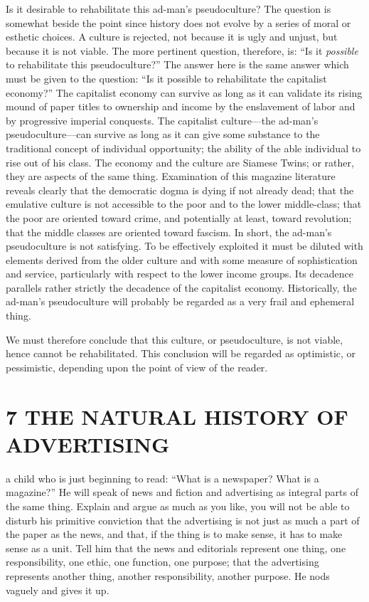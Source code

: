 \documentclass[nohyper,openany,nobib]{tufte-book}
\let\oldchapter\chapter
\def\chapter{%
  \setcounter{footnote}{0}%
  \oldchapter
}
\begin{document}
Is it desirable to rehabilitate this ad-man's pseudoculture? The
question is somewhat beside the point since history does not evolve by a
series of moral or esthetic choices. A culture is rejected, not because
it is ugly and unjust, but because it is not viable. The more pertinent
question, therefore, is: ``Is it \emph{possible} to rehabilitate this
pseudoculture?'' The answer here is the same answer which must be given
to the question: ``Is it possible to rehabilitate the capitalist
economy?'' The capitalist economy can survive as long as it can validate
its rising mound of paper titles to ownership and income by the
enslavement of labor and by progressive imperial conquests. The
capitalist culture---the ad-man's pseudoculture---can survive as long as
it can give some substance to the traditional concept of individual
opportunity; the ability of the able individual to rise out of his
class. The economy and the culture are Siamese Twins; or rather, they
are aspects of the same thing. Examination of this magazine literature
reveals clearly that the democratic dogma is dying if not already dead;
that the emulative culture is not accessible to the poor and to the
lower middle-class; that the poor are oriented toward crime, and
potentially at least, toward revolution; that the middle classes are
oriented toward fascism. In short, the ad-man's pseudoculture is not
satisfying. To be effectively exploited it must be diluted with elements
derived from the older culture and with some measure of sophistication
and service, particularly with respect to the lower income groups. Its
decadence parallels rather strictly the decadence of the capitalist
economy. Historically, the ad-man's pseudoculture will probably be
regarded as a very frail and ephemeral thing.

We must therefore conclude that this culture, or pseudoculture, is not
viable, hence cannot be rehabilitated. This conclusion will be regarded
as optimistic, or pessimistic, depending upon the point of view of the
reader.



\chapter[7 \hspace*{1mm} THE NATURAL HISTORY OF ADVERTISING]{7 THE NATURAL HISTORY OF ADVERTISING}

  a child who is just beginning to read: ``What is a newspaper? What
is a magazine?'' He will speak of news and fiction and advertising as
integral parts of the same thing. Explain and argue as much as you like,
you will not be able to disturb his primitive conviction that the
advertising is not just as much a part of the paper as the news, and
that, if the thing is to make sense, it has to make sense as a unit.
Tell him that the news and editorials represent one thing, one
responsibility, one ethic, one function, one purpose; that the
advertising represents another thing, another responsibility, another
purpose. He nods vaguely and gives it up.
\end{document}
